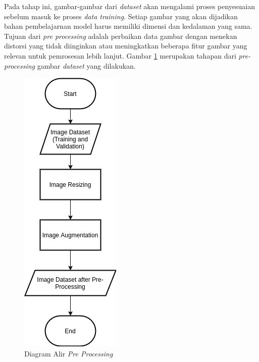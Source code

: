 Pada tahap ini, gambar-gambar dari \textit{dataset} akan mengalami proses penyesuaian sebelum masuk ke proses \textit{data training}. Setiap gambar yang akan dijadikan bahan pembelajarnan model harus memiliki dimensi dan kedalaman yang sama. Tujuan dari \textit{pre processing} adalah perbaikan data gambar dengan menekan distorsi yang tidak diinginkan atau meningkatkan beberapa fitur gambar yang relevan untuk pemrosesan lebih lanjut. Gambar \ref{fig:preprocessing} merupakan tahapan dari \textit{pre-processing} gambar \textit{dataset} yang dilakukan.

\begin{figure}[ht]
	\centering
	\includegraphics[scale=0.5]{gambar/flowchart-preprocessing.png}
	\caption{Diagram Alir \textit{Pre Processing}}
	\label{fig:preprocessing}
\end{figure}

